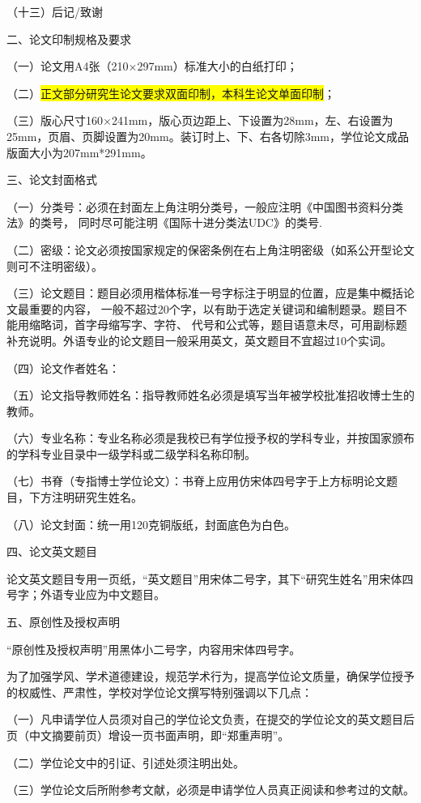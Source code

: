 （十三）后记/致谢

{\hei 二、论文印制规格及要求}

（一）论文用A4张（210×297mm）标准大小的白纸打印；

（二）\colorbox{yellow}{正文部分研究生论文要求双面印制，本科生论文单面印制}；

（三）版心尺寸160×241mm，版心页边距上、下设置为28mm，左、右设置为25mm，页眉、页脚设置为20mm。装订时上、下、右各切除3mm，学位论文成品版面大小为207mm*291mm。

{\hei 三、论文封面格式}

（一）分类号：必须在封面左上角注明分类号，一般应注明《中国图书资料分类法》的类号，
同时尽可能注明《国际十进分类法UDC》的类号.

（二）密级：论文必须按国家规定的保密条例在右上角注明密级（如系公开型论文则可不注明密级）。

（三）论文题目：题目必须用楷体标准一号字标注于明显的位置，应是集中概括论文最重要的内容，
一般不超过20个字，以有助于选定关键词和编制题录。题目不能用缩略词，首字母缩写字、字符、
代号和公式等，题目语意未尽，可用副标题补充说明。外语专业的论文题目一般采用英文，英文题目不宜超过10个实词。

（四）论文作者姓名：

（五）论文指导教师姓名：指导教师姓名必须是填写当年被学校批准招收博士生的教师。

（六）专业名称：专业名称必须是我校已有学位授予权的学科专业，并按国家颁布的学科专业目录中一级学科或二级学科名称印制。

（七）书脊（专指博士学位论文）：书脊上应用仿宋体四号字于上方标明论文题目，下方注明研究生姓名。

（八）论文封面：统一用120克铜版纸，封面底色为白色。

{\hei 四、论文英文题目}

论文英文题目专用一页纸，“英文题目”用宋体二号字，其下“研究生姓名”用宋体四号字；外语专业应为中文题目。

{\hei 五、原创性及授权声明}

“原创性及授权声明”用黑体小二号字，内容用宋体四号字。

为了加强学风、学术道德建设，规范学术行为，提高学位论文质量，确保学位授予的权威性、严肃性，学校对学位论文撰写特别强调以下几点：

（一）凡申请学位人员须对自己的学位论文负责，在提交的学位论文的英文题目后页（中文摘要前页）增设一页书面声明，即“郑重声明”。

（二）学位论文中的引证、引述处须注明出处。

（三）学位论文后所附参考文献，必须是申请学位人员真正阅读和参考过的文献。

